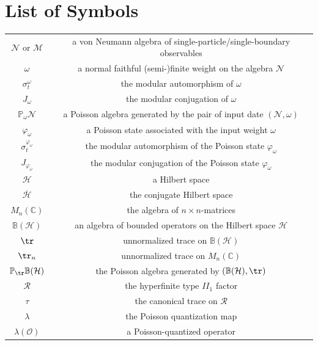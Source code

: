 \documentclass[a4paper,11pt]{article}
\theoremstyle{definition}
\numberwithin{equation}{section}
\begin{document}
\section{List of Symbols}\label{app:symbols}
\begin{longtable}[H]{c|c}
        $\mathcal{N}$ or $\mathcal{M}$ & a von Neumann algebra of single-particle/single-boundary observables  \\
        $\omega$ & a normal faithful (semi-)finite weight on the algebra $\mathcal{N}$ \\
        $\sigma_t^\omega$ & the modular automorphism of $\omega$
        \\
        $J_\omega$ & the modular conjugation of $\omega$
        \\
        $\mathbb{P}_\omega \mathcal{N}$ & a Poisson algebra generated by the pair of input date $(\mathcal{N},\omega)$ \\
        $\varphi_\omega$ & a Poisson state associated with the input weight $\omega$ \\
        $\sigma_t^{\varphi_\omega}$ & the modular automorphism  of the Poisson state $\varphi_\omega$\\
        $J_{\varphi_\omega}$ & the modular conjugation of the Poisson state $\varphi_\omega$
        \\
        $\mathcal{H}$ & a Hilbert space \\
        $\overline{\mathcal{H}}$ & the conjugate Hilbert space
        \\
        $M_n(\mathbb{C})$ & the algebra of $n\times n$-matrices
        \\
        $\mathbb{B}(\mathcal{H})$ & an algebra of bounded operators on the Hilbert space $\mathcal{H}$ \\
        $\tr$ & unnormalized trace on $\mathbb{B}(\mathcal{H})$
        \\
        $\tr_n$ & unnormalized trace on $M_n(\mathbb{C})$
        \\
        $\mathbb{P}_{\tr}\mathbb{B}(\mathcal{H})$ & the Poisson algebra generated by $(\mathbb{B}(\mathcal{H}), \tr)$
        \\
        $\mathcal{R}$ & the hyperfinite type $II_1$ factor
        \\
        $\tau$ & the canonical trace on $\mathcal{R}$
        \\
        $\lambda$ & the Poisson quantization map
        \\
        $\lambda(\mathcal{O})$ & a Poisson-quantized operator
        \\

\end{longtable}
\end{document}
